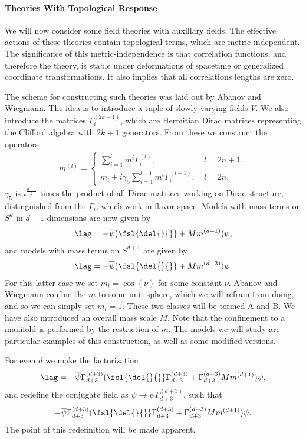 \paragraph{Theories With Topological Response}
We will now consider some field theories with auxillary fields. The effective actions of these theories contain topological terms, which are metric-independent. The significance of this metric-independence is that correlation functions, and therefore the theory, is stable under deformations of spacetime or generalized coordinate transformations. It also implies that all correlations lengths are zero.

The scheme for constructing such theories was laid out by Abanov and Wiegmann. The idea is to introduce a tuple of slowly varying fields $V$. We also introduce the matrices $\Gamma_{i}^{(2k + 1)}$, which are Hermitian Dirac matrices representing the Clifford algebra with $2k + 1$ generators. From these we construct the operators
\begin{align*}
	m^{(l)} = \begin{cases}
		\sum\limits_{i = 1}^{l}m^{i}\Gamma^{(l)}_{i},\ &l = 2n + 1, \\
		m_{l} + i\gamma_{5}\sum\limits_{i = 1}^{l - 1}m^{i}\Gamma^{(l - 1)}_{i},\ &l = 2n.
	\end{cases}
\end{align*}
$\gamma_{5}$ is $i^{\frac{d - 1}{2}}$ times the product of all Dirac matrices working on Dirac structure, distinguished from the $\Gamma_{i}$, which work in flavor space. Models with mass terms on $S^{d}$ in $d + 1$ dimensions are now given by
\begin{align*}
	\lag = -\overline{\psi}(\fsl{\del{}{}} + Mm^{(d + 1)})\psi,
\end{align*}
and models with mass terms on $S^{d + 1}$ are given by
\begin{align*}
	\lag = -\overline{\psi}(\fsl{\del{}{}} + Mm^{(d + 3)})\psi.
\end{align*}
For this latter case we set $m_{l} = \cos(\nu)$ for some constant $\nu$. Abanov and Wiegmann confine the $m$ to some unit sphere, which we will refrain from doing, and so we can simply set $m_{l} = 1$. These two classes will be termed A and B. We have also introduced an overall mass scale $M$. Note that the confinement to a manifold is performed by the restriction of $m$. The models we will study are particular examples of this construction, as well as some modified versions.

For even $d$ we make the factorization
\begin{align*}
	\lag = -\overline{\psi}\Gamma_{d + 3}^{(d + 3)}(\fsl{\del{}{}}\Gamma_{d + 3}^{(d + 3)} + \Gamma_{d + 3}^{(d + 3)}Mm^{(d + 1)})\psi,
\end{align*}
and redefine the conjugate field as $\overline{\psi}\to\overline{\psi}\Gamma_{d + 3}^{(d + 3)}$, such that
\begin{align*}
	-\overline{\psi}\Gamma_{d + 3}^{(d + 3)}(\fsl{\del{}{}}\Gamma_{d + 3}^{(d + 3)} + \Gamma_{d + 3}^{(d + 3)}Mm^{(d + 1)})\psi.
\end{align*}
The point of this redefinition will be made apparent.

